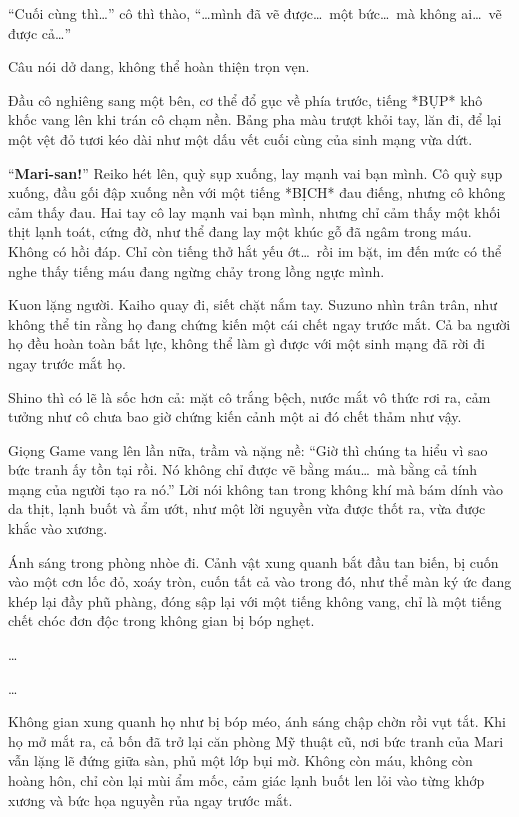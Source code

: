 \documentclass[../main.tex]{subfiles}
\begin{document}
``Cuối cùng thì\dots'' cô thì thào, ``\dots mình đã vẽ được\dots\ một bức\dots\ mà không ai\dots\ vẽ được cả\dots''

Câu nói dở dang, không thể hoàn thiện trọn vẹn.

Đầu cô nghiêng sang một bên, cơ thể đổ gục về phía trước, tiếng *BỤP* khô khốc vang lên khi trán cô chạm nền. Bảng pha màu trượt khỏi tay, lăn đi, để lại một vệt đỏ tươi kéo dài như một dấu vết cuối cùng của sinh mạng vừa dứt.


``\textbf{Mari-san!}'' Reiko hét lên, quỳ sụp xuống, lay mạnh vai bạn mình. Cô quỳ sụp xuống, đầu gối đập xuống nền với một tiếng *BỊCH* đau điếng, nhưng cô không cảm thấy đau. Hai tay cô lay mạnh vai bạn mình, nhưng chỉ cảm thấy một khối thịt lạnh toát, cứng đờ, như thể đang lay một khúc gỗ đã ngâm trong máu. Không có hồi đáp. Chỉ còn tiếng thở hắt yếu ớt\dots\ rồi im bặt, im đến mức có thể nghe thấy tiếng máu đang ngừng chảy trong lồng ngực mình.

Kuon lặng người. Kaiho quay đi, siết chặt nắm tay. Suzuno nhìn trân trân, như không thể tin rằng họ đang chứng kiến một cái chết ngay trước mắt. Cả ba người họ đều hoàn toàn bất lực, không thể làm gì được với một sinh mạng đã rời đi ngay trước mắt họ.

Shino thì có lẽ là sốc hơn cả: mặt cô trắng bệch, nước mắt vô thức rơi ra, cảm tưởng như cô chưa bao giờ chứng kiến cảnh một ai đó chết thảm như vậy.

Giọng Game vang lên lần nữa, trầm và nặng nề: ``Giờ thì chúng ta hiểu vì sao bức tranh ấy tồn tại rồi. Nó không chỉ được vẽ bằng máu\dots\ mà bằng cả tính mạng của người tạo ra nó.'' Lời nói không tan trong không khí mà bám dính vào da thịt, lạnh buốt và ẩm ướt, như một lời nguyền vừa được thốt ra, vừa được khắc vào xương.

Ánh sáng trong phòng nhòe đi. Cảnh vật xung quanh bắt đầu tan biến, bị cuốn vào một cơn lốc đỏ, xoáy tròn, cuốn tất cả vào trong đó, như thể màn ký ức đang khép lại đầy phũ phàng, đóng sập lại với một tiếng không vang, chỉ là một tiếng chết chóc đơn độc trong không gian bị bóp nghẹt.

\dots

\dots

\ct

Không gian xung quanh họ như bị bóp méo, ánh sáng chập chờn rồi vụt tắt. Khi họ mở mắt ra, cả bốn đã trở lại căn phòng Mỹ thuật cũ, nơi bức tranh của Mari vẫn lặng lẽ đứng giữa sàn, phủ một lớp bụi mờ. Không còn máu, không còn hoàng hôn, chỉ còn lại mùi ẩm mốc, cảm giác lạnh buốt len lỏi vào từng khớp xương và bức họa nguyền rủa ngay trước mắt.
\end{document}
